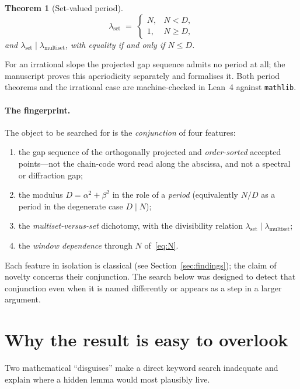 \documentclass[11pt]{article}
\theoremstyle{plain}
\newtheorem{theorem}{Theorem}
\theoremstyle{remark}
\newcommand{\lmult}{\lambda_{\mathrm{multiset}}}
\newcommand{\lset}{\lambda_{\mathrm{set}}}
\begin{document}
\begin{theorem}[Set-valued period]\label{thm:set}
\[
  \lset \;=\;
  \begin{cases} N, & N<D,\\[2pt] 1, & N\ge D, \end{cases}
\]
and $\lset \mid \lmult$, with equality if and only if $N\le D$.
\end{theorem}

For an irrational slope the projected gap sequence admits no period at all; the
manuscript proves this aperiodicity separately and formalises it. Both period
theorems and the irrational case are machine-checked in Lean~4 against
\texttt{mathlib}.

\paragraph{The fingerprint.}
The object to be searched for is the \emph{conjunction} of four features:
\begin{enumerate}[label=(\roman*),leftmargin=2.2em,itemsep=2pt]
  \item the gap sequence of the orthogonally projected and \emph{order-sorted}
        accepted points---not the chain-code word read along the abscissa, and not a
        spectral or diffraction gap;
  \item the modulus $D=\alpha^2+\beta^2$ in the role of a \emph{period}
        (equivalently $N/D$ as a period in the degenerate case $D\mid N$);
  \item the \emph{multiset-versus-set} dichotomy, with the divisibility relation
        $\lset\mid\lmult$;
  \item the \emph{window dependence} through $N$ of~\eqref{eq:N}.
\end{enumerate}
Each feature in isolation is classical (see Section~\ref{sec:findings}); the claim
of novelty concerns their conjunction. The search below was designed to detect that
conjunction even when it is named differently or appears as a step in a larger
argument.

\section{Why the result is easy to overlook}\label{sec:disguise}

Two mathematical ``disguises'' make a direct keyword search inadequate and explain
where a hidden lemma would most plausibly live.
\end{document}

